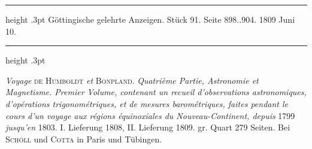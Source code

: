\par\bigskip
{}
\hypertarget{native-517-lower}{}\label{native-517-lower}
\begin{center}\parbox{.85\linewidth}{\centering\small
\hrule height .3pt\relax\vspace{2.5pt}
Göttingische gelehrte Anzeigen. Stück 91. Seite 898..904. 1809 Juni 10.\par
\vspace{2.5pt}\hrule height .3pt\relax
}\end{center}

\emph{Voyage} \textsc{de Humboldt} \emph{et} \textsc{Bonpland}. \emph{Quatrième Partie, Astronomie et Magnetisme. Premier Volume, contenant un recueil d'observations astronomiques, d'opérations trigonométriques, et de mesures barométriques, faites pendant le cours d'un voyage aux régions équinoxiales du Nouveau-Continent, depuis} 1799 \emph{jusqu'en} 1803. I. Lieferung 1808, II. Lieferung 1809. gr. Quart 279 Seiten. Bei \textsc{Schöll} und \textsc{Cotta} in Paris und Tübingen.

